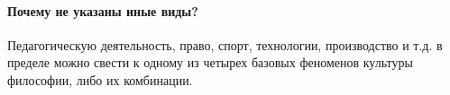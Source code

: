 \paragraph{Почему не указаны иные виды?} 

Педагогическую деятельность, право, спорт, технологии, производство и т.д. в пределе можно свести к одному из четырех базовых феноменов культуры философии, либо их комбинации.




